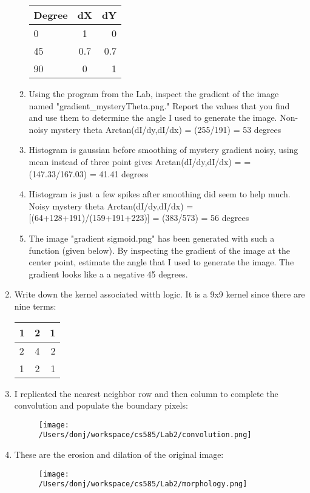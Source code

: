 \documentclass{article}
\begin{document}
\begin{enumerate}
\begin{enumerate}
\begin{tabular}{| l |c |r |}
\hline
Degree &	dX &	 dY \\
\hline
0 &	1 &	0 \\	
\hline
45 &	0.7 &	0.7 \\
\hline
90 & 0 & 1 \\
\hline
\end{tabular}

	\item Using the program from the Lab, inspect the gradient of the image named "gradient_mysteryTheta.png." Report the values that you find and use them to determine the angle I used to generate the image.
	\linebreak
	Non-noisy mystery theta Arctan(dI/dy,dI/dx) = (255/191) = 53 degrees
	\item
	Histogram is gaussian before smoothing of mystery gradient noisy, using mean instead of three point gives Arctan(dI/dy,dI/dx) =  = (147.33/167.03) = 41.41 degrees
	\item 
	Histogram is just a few spikes after smoothing did seem to help much. Noisy mystery theta Arctan(dI/dy,dI/dx) = [(64+128+191)/(159+191+223)] = (383/573) = 56 degrees
	\item The image "gradient sigmoid.png" has been generated with such a function (given below). By inspecting the gradient of the image at the center point, estimate the angle that I used to generate the image.
	\linebreak
	The gradient looks like a a negative 45 degrees.
\end{enumerate}

\item Write down the kernel associated witth logic. It is a 9x9 kernel since there are nine terms:
\begin{tabular}{| l |c |r |}
\hline
1 &	2 &	1 \\
\hline
2 &	4 &	2 \\	
\hline
1 &	2 &	1 \\
\hline
\end{tabular}
	
\item
I replicated the nearest neighbor row and then column to complete the convolution and populate the boundary pixels:
\begin{figure}[H]
\centering
\texttt{[image: /Users/donj/workspace/cs585/Lab2/convolution.png]}
\end{figure}

\item
These are the erosion and dilation of the original image:
\begin{figure}[H]
\centering
\texttt{[image: /Users/donj/workspace/cs585/Lab2/morphology.png]}
\end{figure}


\end{enumerate}
\end{document}

